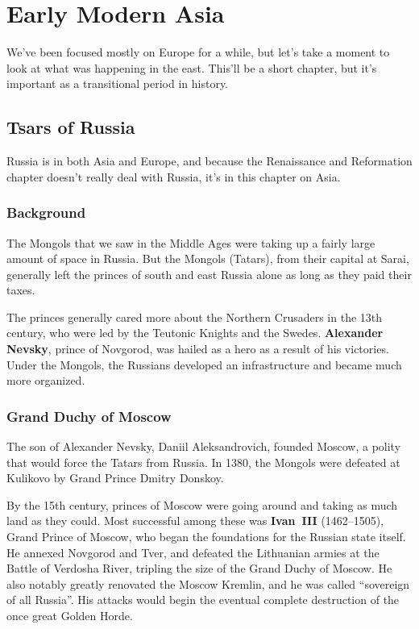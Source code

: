\chapter{Early Modern Asia}

We've been focused mostly on Europe for a while,
but let's take a moment to look at what was happening in the east.
This'll be a short chapter, but it's important as a transitional period in history.

\section{Tsars of Russia}

Russia is in both Asia and Europe,
and because the Renaissance and Reformation chapter doesn't really deal with Russia,
it's in this chapter on Asia.

\subsection*{Background}

The Mongols that we saw in the Middle Ages were taking up a fairly large amount of space in Russia.
But the Mongols (Tatars), from their capital at Sarai,
generally left the princes of south and east Russia alone as long as they paid their taxes.

The princes generally cared more about the Northern Crusaders in the 13th century,
who were led by the Teutonic Knights and the Swedes.
\textbf{Alexander Nevsky}, prince of Novgorod, was hailed as a hero as a result of his victories.
Under the Mongols, the Russians developed an infrastructure and became much more organized.

\subsection*{Grand Duchy of Moscow}

The son of Alexander Nevsky, Daniil Aleksandrovich, founded Moscow,
a polity that would force the Tatars from Russia.
In 1380, the Mongols were defeated at Kulikovo by Grand Prince Dmitry Donskoy.

By the 15th century, princes of Moscow were going around and taking as much land as they could.
Most successful among these was \textbf{Ivan~III} (1462--1505), Grand Prince of Moscow,
who began the foundations for the Russian state itself.
He annexed Novgorod and Tver, and defeated the Lithuanian armies at the Battle of Verdosha River,
tripling the size of the Grand Duchy of Moscow.
He also notably greatly renovated the Moscow Kremlin, and he was called ``sovereign of all Russia''.
His attacks would begin the eventual complete destruction of the once great Golden Horde.

